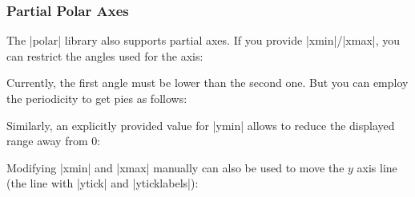 {\subsubsection{Partial Polar Axes}
The |polar| library also supports partial axes. If you provide |xmin|/|xmax|, you can restrict the angles used for the axis:
\begin{codeexample}[]
\end{codeexample}

Currently, the first angle must be lower than the second one. But you can employ the periodicity to get pies as follows:
\begin{codeexample}[]
\end{codeexample}
\noindent Similarly, an explicitly provided value for |ymin| allows to reduce the displayed range away from $0$:
\begin{codeexample}[]
\end{codeexample}

\noindent Modifying |xmin| and |xmax| manually can also be used to move the $y$ axis line (the line with |ytick| and |yticklabels|):
\begin{codeexample}[]
\end{codeexample}
}

